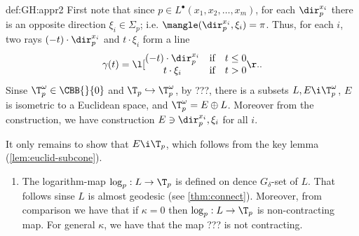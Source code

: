 {\begin{subthm}{def:GH:appr2}
First note that since $p\in L^\bullet (x_1,x_2,\dots,x_m)$, for each $\dir^{x_i}_{p}$ there is an opposite direction $\xi_i\in \Sigma_p$; i.e. $\mangle(\dir^{x_i}_{p},\xi_i)=\pi$.
Thus, for each $i$, two rays $(-t)\cdot\dir^{x_i}_{p}$ and $t\cdot\xi_i$ form a line
$$
\gamma(t)
=\l[
\begin{matrix}
(-t)\cdot\dir^{x_i}_{p}&\text{if}&t\le0\\
t\cdot\xi_i&\text{if}&t>0
\end{matrix}\r. .
$$
Sinse $\T^\omega_p\in\CBB{}{0}$ and $\T_p\hookrightarrow \T_p^\omega$, by ???, there is a subsets $L,E\i \T_p^\omega$, $E$ is isometric to a Euclidean space, and $\T^\omega_p=E\oplus L$.
Moreover from the construction, we have construction $E\ni \dir_p^{x_i},\xi_i$ for all $i$.

It only remains to show that $E\i \T_p$, which follows from the key lemma (\ref{lem:euclid-subcone}).\qeds
















\begin{enumerate}

\item The logarithm-map $\log_p:L\to \T_p$ is defined on dence $G_\delta$-set of $L$.
That follows sinse $L$ is almost geodesic (see \ref{thm:connect}).
Moreover, from comparison we have that if $\kappa=0$ then $\log_p:L\to \T_p$ is non-contracting map.
For general $\kappa$, we have that the map ??? is not contracting.
\end{enumerate}















\end{subthm}}
